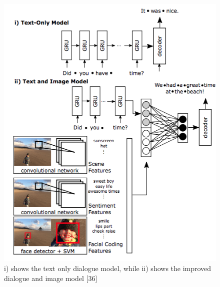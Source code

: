\documentclass[letterpaper, 10 pt, conference]{IEEEtran}
\begin{document}
\begin{figure}[!ht]
\renewcommand\figurename{Fig.}
\centering
\includegraphics[width=\columnwidth]{gru}
\caption{i) shows the text only dialogue model, while ii) shows the improved dialogue and image model [36]}
\end{figure} 
\end{document}
